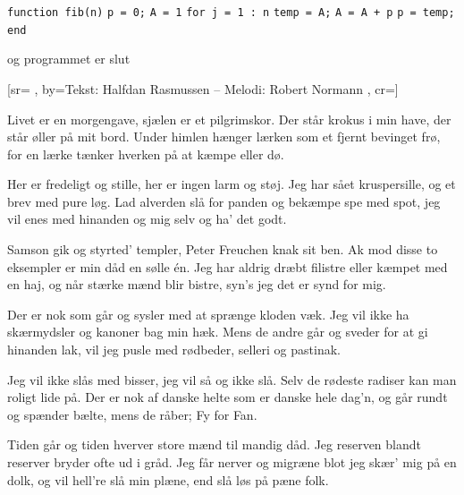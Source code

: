 \documentclass[pdftex,12pt]{article}
\begin{document}
\begin{songs}{}
\endverse
\beginverse
\texttt{function fib(n)}
\hspace*{3mm}\texttt{p = 0;}
\hspace*{3mm}\texttt{A = 1}
\hspace*{3mm}\texttt{for j = 1 : n}
\hspace*{3mm}\hspace*{3mm}\texttt{temp = A;}
\hspace*{3mm}\hspace*{3mm}\texttt{A = A + p}
\hspace*{3mm}\hspace*{3mm}\texttt{p = temp;}
\hspace*{3mm}\texttt{end}

\endverse
\beginverse
og programmet er slut

\endverse
\endsong



﻿[sr={}
,
by={Tekst: Halfdan Rasmussen -- Melodi: Robert Normann}
,
cr={}]\hypertarget{Noget om helte}{}
\label{song11}

\beginverse
Livet er en morgengave,
sjælen er et pilgrimskor.
Der står krokus i min have,
der står øller på mit bord.
Under himlen hænger lærken
som et fjernt bevinget frø,
for en lærke tænker hverken
på at kæmpe eller dø.
\endverse

\beginverse
Her er fredeligt og stille,
her er ingen larm og støj.
Jeg har sået kruspersille,
og et brev med pure løg.
Lad alverden slå for panden
og bekæmpe spe med spot,
jeg vil enes med hinanden
og mig selv og ha' det godt.
\endverse

\beginverse
Samson gik og styrted' templer,
Peter Freuchen knak sit ben.
Ak mod disse to eksempler
er min dåd en sølle én.
Jeg har aldrig dræbt filistre
eller kæmpet med en haj,
og når stærke mænd blir bistre,
syn's jeg det er synd for mig.
\endverse

\beginverse
Der er nok som går og sysler
med at sprænge kloden væk.
Jeg vil ikke ha skærmydsler
og kanoner bag min hæk.
Mens de andre går og sveder
for at gi hinanden lak,
vil jeg pusle med rødbeder,
selleri og pastinak.
\endverse

\beginverse
Jeg vil ikke slås med bisser,
jeg vil så og ikke slå.
Selv de rødeste radiser
kan man roligt lide på.
Der er nok af danske helte
som er danske hele dag'n,
og går rundt og spænder bælte,
mens de råber; Fy for Fan.
\endverse

\beginverse
Tiden går og tiden hverver
store mænd til mandig dåd.
Jeg reserven blandt reserver
bryder ofte ud i gråd.
Jeg får nerver og migræne
blot jeg skær' mig på en dolk,
og vil hell're slå min plæne,
end slå løs på pæne folk.
\endverse


\end{songs}
\end{document}

